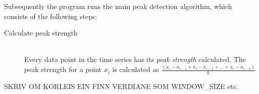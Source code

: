 Subsequently the program runs the main peak detection algorithm, which consists of the following steps:
\begin{description}
\item[Calculate peak strength] \hfill \\
Every data point in the time series has its \emph{peak strength} calculated. The peak strength for a point $x_{i}$ is calculated as $\frac{(x_{i} - x_{i-1} + x_{i} - x_{i-1} + \ldots + x_{i} - x_{i-k})}{k}$
\end{description}

SKRIV OM KORLEIS EIN FINN VERDIANE SOM WINDOW\_SIZE etc. 
